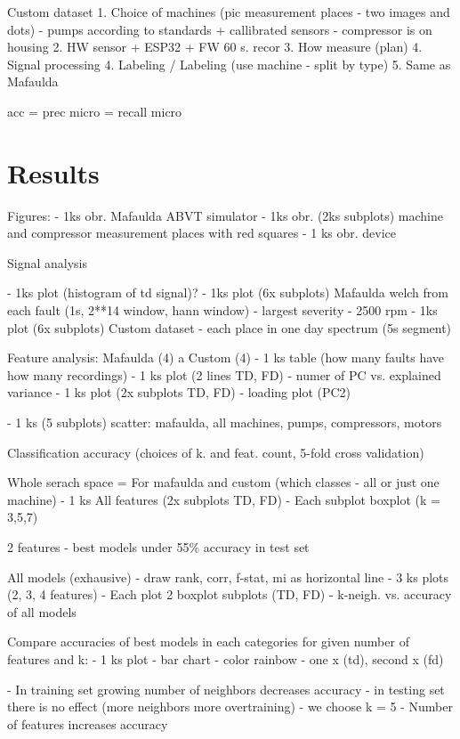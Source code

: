 \documentclass{llncs}
\begin{document}
Custom dataset
1. Choice of machines (pic measurement places - two images and dots) - pumps according to standards + callibrated sensors
	- compressor is on housing
2. HW sensor + ESP32 + FW 60 s. recor
3. How measure (plan)
4. Signal processing
4. Labeling  / Labeling (use machine - split by type) 
5. Same as Mafaulda

acc = prec micro = recall micro



\section{Results}


Figures:
- 1ks obr. Mafaulda ABVT simulator
- 1ks obr. (2ks subplots) machine and compressor measurement places with red squares
- 1 ks obr. device 


Signal analysis

- 1ks plot (histogram of td signal)?
- 1ks plot (6x subplots) Mafaulda welch from each fault (1s, 2**14 window, hann window)  - largest severity - 2500 rpm
- 1ks plot (6x subplots) Custom dataset - each place in one day spectrum (5s segment)

Feature analysis:
Mafaulda (4) a Custom (4) 
- 1 ks table (how many faults have how many recordings)
- 1 ks plot (2 lines TD, FD) - numer of PC vs. explained variance
- 1 ks plot (2x subplots TD, FD) - loading plot (PC2)

- 1 ks (5 subplots) scatter: mafaulda, all machines, pumps, compressors, motors


Classification accuracy (choices of k. and feat. count, 5-fold cross validation)

Whole serach space = For mafaulda and custom (which classes - all or just one machine)
- 1 ks All features (2x subplots TD, FD)
	- Each subplot boxplot (k = 3,5,7)

2 features - best models under 55\% accuracy in test set

All models (exhausive) - draw rank, corr, f-stat, mi as horizontal line
	- 3 ks plots (2, 3, 4 features)
		- Each plot 2 boxplot subplots (TD, FD) - k-neigh. vs. accuracy of all models


Compare accuracies of best models in each categories for given number of features and k:
- 1 ks plot - bar chart - color rainbow - one x (td), second x (fd)



- In training set growing number of neighbors decreases accuracy - in testing set there is no effect (more neighbors more overtraining)
	- we choose k = 5
- Number of features increases accuracy
\end{document}
